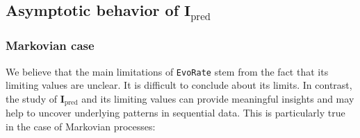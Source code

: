 \documentclass{article}
\begin{document}
\subsection{Asymptotic behavior of $\mathbf{I}_{\text{pred}}$}

\subsubsection{Markovian case}
We believe that the main limitations of \texttt{EvoRate} stem from the fact that its limiting values are unclear. It is difficult to conclude about its limits. 
In contrast, the study of $\mathbf{I}_{\text{pred}}$
and its limiting values can provide meaningful insights and may help to uncover underlying patterns in sequential data. This is particularly true in the case of Markovian processes:
\end{document}
